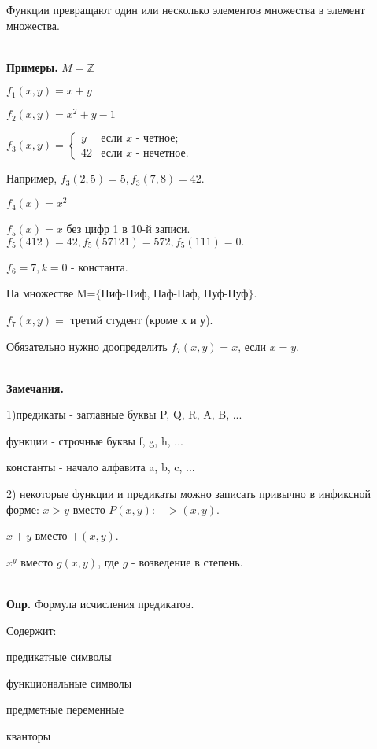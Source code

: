 \documentclass{article}
\begin{document}
Функции превращают один или несколько элементов множества в элемент множества.

~\\
\textbf{Примеры.} $M = \mathds{Z}$

$f_1(x,y) = x+y$

$f_2(x,y) = x^2+y-1$

$f_3(x,y) = 
\left\{ \begin{array}{ll}
         y & \mbox{если $x$ - четное};\\
        42 & \mbox{если $x$ - нечетное}.\end{array} \right. $
        
Например, $f_3(2,5) = 5, f_3(7,8)=42$.

$f_4(x)=x^2$

$f_5(x) = x$ без цифр 1 в 10-й записи. 
$f_5(412) = 42, f_5(57121)=572, f_5(111) = 0.$

$f_6 = 7, k=0$ - константа.

На множестве M=$\{$Ниф-Ниф, Наф-Наф, Нуф-Нуф$\}$.

$f_7(x,y) =$ третий студент (кроме х и у).

Обязательно нужно доопределить $f_7(x,y) = x$, если $x=y$.


~\\
\textbf{Замечания.}

1)предикаты - заглавные буквы P, Q, R, A, B, ...

функции - строчные буквы f, g, h, ...

константы - начало алфавита a, b, c, ...

2) некоторые функции и предикаты можно записать привычно в инфиксной форме: $x>y$ вместо $P(x,y):\hspace{10pt} >(x,y)$.

$x+y$ вместо $+(x,y)$.

$x^y$ вместо $g(x,y)$, где $g$ - возведение в степень.


~\\
\textbf{Опр.} Формула исчисления предикатов.

Содержит:

\hspace{10 pt}предикатные символы

\hspace{10 pt}функциональные символы

\hspace{10 pt}предметные переменные

\hspace{10 pt}кванторы
\end{document}
